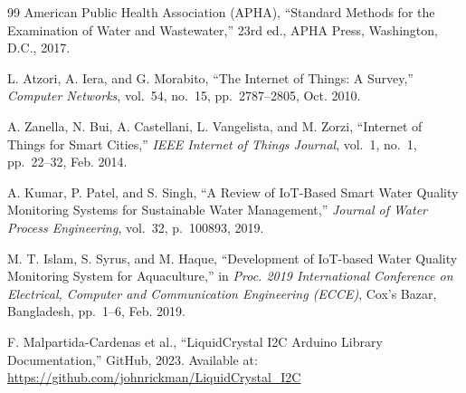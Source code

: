 \documentclass[12pt,a4paper]{article}
\begin{document}
\begin{thebibliography}{99}
American Public Health Association (APHA),
``Standard Methods for the Examination of Water and Wastewater,''
23rd ed., APHA Press, Washington, D.C., 2017.

L. Atzori, A. Iera, and G. Morabito,
``The Internet of Things: A Survey,''
\textit{Computer Networks}, vol.~54, no.~15, pp.~2787--2805, Oct. 2010.

A. Zanella, N. Bui, A. Castellani, L. Vangelista, and M. Zorzi,
``Internet of Things for Smart Cities,''
\textit{IEEE Internet of Things Journal}, vol.~1, no.~1, pp.~22--32, Feb. 2014.

A. Kumar, P. Patel, and S. Singh,
``A Review of IoT-Based Smart Water Quality Monitoring Systems for Sustainable Water Management,''
\textit{Journal of Water Process Engineering}, vol.~32, p.~100893, 2019.

M. T. Islam, S. Syrus, and M. Haque,
``Development of IoT-based Water Quality Monitoring System for Aquaculture,''
in \textit{Proc. 2019 International Conference on Electrical, Computer and Communication Engineering (ECCE)},
Cox's Bazar, Bangladesh, pp.~1--6, Feb. 2019.

F. Malpartida-Cardenas et al.,
``LiquidCrystal I2C Arduino Library Documentation,''
GitHub, 2023. Available at: \url{https://github.com/johnrickman/LiquidCrystal_I2C}

\end{thebibliography}
\end{document}
